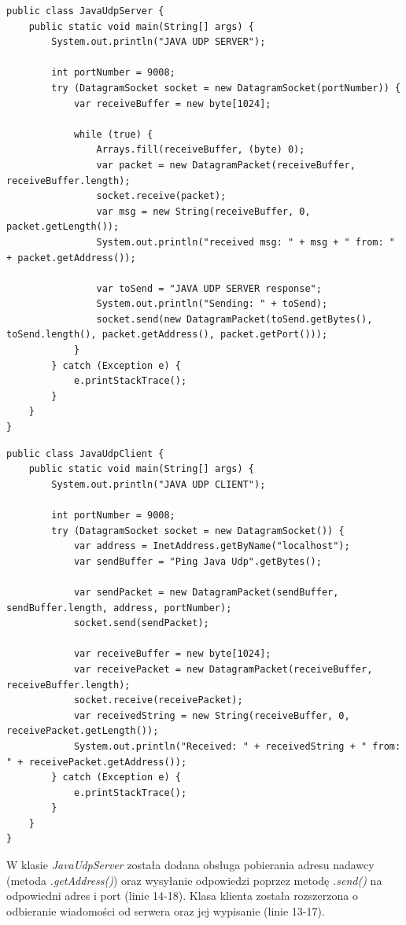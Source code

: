 \documentclass[12pt]{article}
\begin{document}
\begin{verbatim}
public class JavaUdpServer {
    public static void main(String[] args) {
        System.out.println("JAVA UDP SERVER");

        int portNumber = 9008;
        try (DatagramSocket socket = new DatagramSocket(portNumber)) {
            var receiveBuffer = new byte[1024];

            while (true) {
                Arrays.fill(receiveBuffer, (byte) 0);
                var packet = new DatagramPacket(receiveBuffer, receiveBuffer.length);
                socket.receive(packet);
                var msg = new String(receiveBuffer, 0, packet.getLength());
                System.out.println("received msg: " + msg + " from: " + packet.getAddress());

                var toSend = "JAVA UDP SERVER response";
                System.out.println("Sending: " + toSend);
                socket.send(new DatagramPacket(toSend.getBytes(), toSend.length(), packet.getAddress(), packet.getPort()));
            }
        } catch (Exception e) {
            e.printStackTrace();
        }
    }
}
\end{verbatim}

\begin{verbatim}
public class JavaUdpClient {
    public static void main(String[] args) {
        System.out.println("JAVA UDP CLIENT");

        int portNumber = 9008;
        try (DatagramSocket socket = new DatagramSocket()) {
            var address = InetAddress.getByName("localhost");
            var sendBuffer = "Ping Java Udp".getBytes();

            var sendPacket = new DatagramPacket(sendBuffer, sendBuffer.length, address, portNumber);
            socket.send(sendPacket);

            var receiveBuffer = new byte[1024];
            var receivePacket = new DatagramPacket(receiveBuffer, receiveBuffer.length);
            socket.receive(receivePacket);
            var receivedString = new String(receiveBuffer, 0, receivePacket.getLength());
            System.out.println("Received: " + receivedString + " from: " + receivePacket.getAddress());
        } catch (Exception e) {
            e.printStackTrace();
        }
    }
}
\end{verbatim}

W klasie \emph{JavaUdpServer} została dodana obsługa pobierania adresu nadawcy (metoda \emph{.getAddress()}) oraz wysyłanie odpowiedzi poprzez metodę \emph{.send()} na odpowiedni adres i port (linie 14-18). Klasa klienta została rozszerzona o odbieranie wiadomości od serwera oraz jej wypisanie (linie 13-17).
\end{document}
